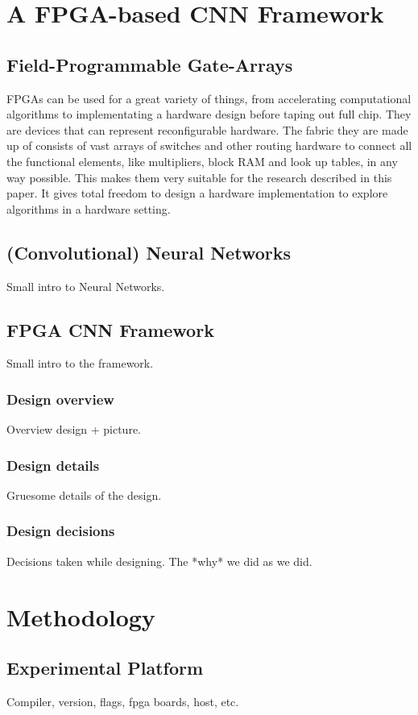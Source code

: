 \documentclass[techrep,english]{ipsj}
\begin{document}
\section{A FPGA-based CNN Framework}
\subsection{Field-Programmable Gate-Arrays}
FPGAs can be used for a great variety of things, from accelerating computational algorithms to implementating a hardware design before taping out full chip.
They are devices that can represent reconfigurable hardware. 
The fabric they are made up of consists of vast arrays of switches and other routing hardware to connect all the functional elements, like multipliers, block RAM and look up tables, in any way possible.
This makes them very suitable for the research described in this paper.
It gives total freedom to design a hardware implementation to explore algorithms in a hardware setting.

\subsection{(Convolutional) Neural Networks}
Small intro to Neural Networks.

\subsection{FPGA CNN Framework}
Small intro to the framework.
\subsubsection{Design overview}
Overview design + picture.
\subsubsection{Design details}
Gruesome details of the design.
\subsubsection{Design decisions}
Decisions taken while designing. The *why* we did as we did.

\section{Methodology}
\subsection{Experimental Platform}
Compiler, version, flags, fpga boards, host, etc.
\end{document}
